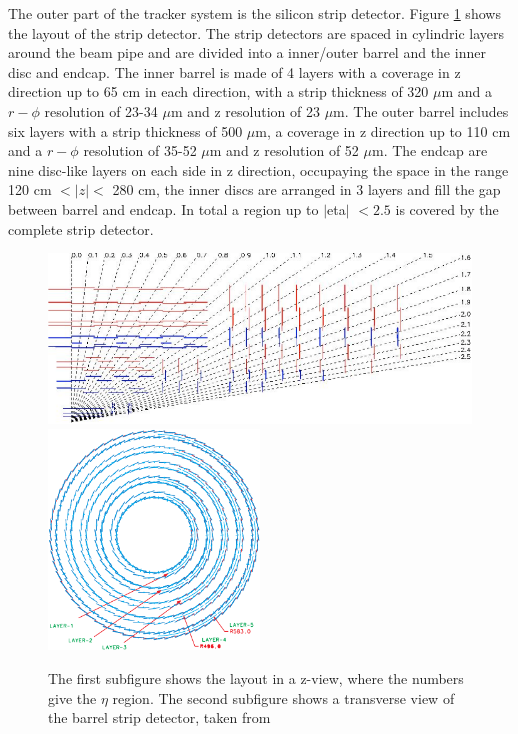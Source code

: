 The outer part of the tracker system is the silicon strip detector. Figure \ref{fig:fig_2_7} shows the layout of the strip detector. The strip detectors are spaced in cylindric layers around the beam pipe and are divided into a inner/outer barrel and the inner disc and endcap. The inner barrel is made of 4 layers with a coverage in z direction up to 65 cm in each direction, with a strip thickness of 320 $\mu$m and a $r-\phi$ resolution of 23-34 $\mu$m and z resolution of 23 $\mu$m. The outer barrel includes six layers with a strip thickness of 500 $\mu$m, a coverage in z direction up to 110 cm and a $r-\phi$ resolution of 35-52 $\mu$m and z resolution of 52 $\mu$m. The endcap are nine disc-like layers on each side in z direction, occupaying the space in the range 120 cm $< |z| < $ 280 cm, the inner discs are arranged in 3 layers and fill the gap between barrel and endcap. In total a region up to $|$\gls{eta}$|$ $< 2.5$ is covered by the complete strip detector. \\

\begin{figure}[ht]
	\centering
	\includegraphics[width=1\textwidth]{pictures/CMS_strip.pdf}
	\includegraphics[width=0.5\textwidth]{pictures/CMS_strip2.pdf}

	\caption[Strip detector of CMS]{The first subfigure shows the layout in a z-view, where the numbers give the $\eta$ region. The second subfigure shows a transverse view of the barrel strip detector, taken from \cite{CMS2, ECAL}}
	\label{fig:fig_2_7}
\end{figure}

